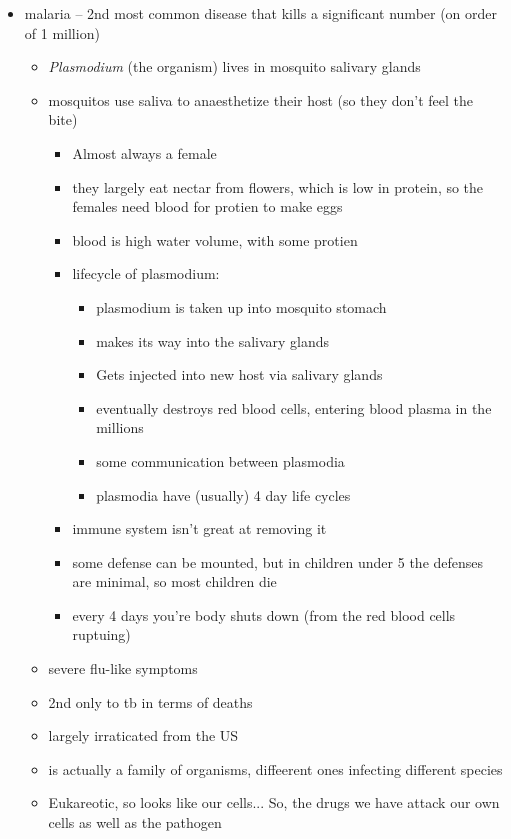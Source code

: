 \documentclass{article}
\theoremstyle{definition}
\begin{document}
\begin{itemize}
	\item malaria -- 2nd most common disease that kills a significant number (on order of 1 million)
		\begin{itemize}
			\item \textit{Plasmodium} (the organism) lives in mosquito salivary glands
			\item mosquitos use saliva to anaesthetize their host (so they don't feel the bite)
				\begin{itemize}
					\item Almost always a female
					\item they largely eat nectar from flowers, which is low in protein, so the females need blood for protien to make eggs
					\item blood is high water volume, with some protien
					\item lifecycle of plasmodium:
						\begin{itemize}
							\item plasmodium is taken up into mosquito stomach
							\item makes its way into the salivary glands
							\item Gets injected into new host via salivary glands
							\item eventually destroys red blood cells, entering blood plasma in the millions
							\item some communication between plasmodia
							\item plasmodia have (usually) 4 day life cycles
						\end{itemize}
					\item immune system isn't great at removing it
					\item some defense can be mounted, but in children under 5 the defenses are minimal, so most children die
					\item every 4 days you're body shuts down (from the red blood cells ruptuing)
				\end{itemize}
			\item severe flu-like symptoms
			\item 2nd only to tb in terms of deaths
			\item largely irraticated from the US
			\item is actually a family of organisms, diffeerent ones infecting different  species
			\item Eukareotic, so looks like our cells... So, the drugs we have attack our own cells as well as the pathogen

\end{itemize}
\end{itemize}
\end{document}
